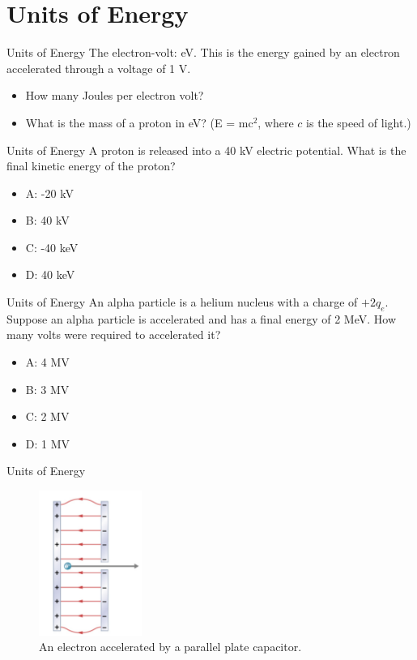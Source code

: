 \documentclass{beamer}
\begin{document}
\section{Units of Energy}

\begin{frame}{Units of Energy}
The electron-volt: eV.  This is the energy gained by an electron accelerated through a voltage of 1 V.
\begin{itemize}
\item How many Joules per electron volt?
\item What is the mass of a proton in eV? (E = mc$^2$, where $c$ is the speed of light.)
\end{itemize}
\end{frame}

\begin{frame}{Units of Energy}
A proton is released into a 40 kV electric potential.  What is the final kinetic energy of the proton?
\begin{itemize}
\item A: -20 kV
\item B: 40 kV
\item C: -40 keV
\item D: 40 keV
\end{itemize}
\end{frame}

\begin{frame}{Units of Energy}
An alpha particle is a helium nucleus with a charge of $+2 q_e$.  Suppose an alpha particle is accelerated and has a final energy of 2 MeV.  How many volts were required to accelerated it?
\begin{itemize}
\item A: 4 MV
\item B: 3 MV
\item C: 2 MV
\item D: 1 MV
\end{itemize}
\end{frame}

\begin{frame}{Units of Energy}
\begin{figure}
\centering
\includegraphics[width=0.3\textwidth]{figures/accel_plates.png}
\caption{\label{fig:accel_plate} An electron accelerated by a parallel plate capacitor.}
\end{figure}
\end{frame}
\end{document}
